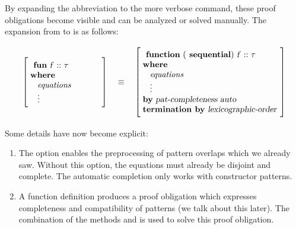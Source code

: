 \begin{isabellebody}
\begin{isamarkuptext}
  By expanding the abbreviation to the more verbose  command, these proof obligations become visible and can be analyzed or
  solved manually. The expansion from  to  is as follows:

\end{isamarkuptext}


\[\left[\;\begin{minipage}{0.25\textwidth}\vspace{6pt}
\cmd{fun} \isa{f\ {\isacharcolon}{\isacharcolon}\ {\isasymtau}}\\%
\cmd{where}\\%
\hspace*{2ex}{\it equations}\\%
\hspace*{2ex}\vdots\vspace*{6pt}
\end{minipage}\right]
\quad\equiv\quad
\left[\;\begin{minipage}{0.48\textwidth}\vspace{6pt}
\cmd{function} \isa{{\isacharparenleft}}\cmd{sequential}\isa{{\isacharparenright}\ f\ {\isacharcolon}{\isacharcolon}\ {\isasymtau}}\\%
\cmd{where}\\%
\hspace*{2ex}{\it equations}\\%
\hspace*{2ex}\vdots\\%
\cmd{by} \isa{pat{\isacharunderscore}completeness\ auto}\\%
\cmd{termination by} \isa{lexicographic{\isacharunderscore}order}\vspace{6pt}
\end{minipage}
\right]\]

\begin{isamarkuptext}
  \vspace*{1em}
  \noindent Some details have now become explicit:

  \begin{enumerate}
  \item The  option enables the preprocessing of
  pattern overlaps which we already saw. Without this option, the equations
  must already be disjoint and complete. The automatic completion only
  works with constructor patterns.

  \item A function definition produces a proof obligation which
  expresses completeness and compatibility of patterns (we talk about
  this later). The combination of the methods  and
   is used to solve this proof obligation.


\end{enumerate}
\end{isamarkuptext}
\end{isabellebody}
